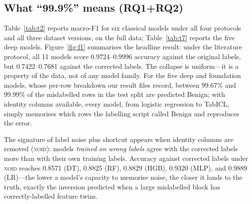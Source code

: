 \documentclass[preprint,12pt]{elsarticle}
\begin{document}
\subsection{What ``99.9\%'' means (RQ1+RQ2)}
\label{sec:99}

Table~\ref{tab:t2} reports macro-F1 for six classical models under all four
protocols and all three dataset versions, on the full data;
Table~\ref{tab:t7} reports the five deep models. Figure~\ref{fig:f1} summarises
the headline result: under the literature protocol, all 11 models score
0.9724--0.9996 accuracy against the original labels, but 0.7422--0.7681 against
the corrected labels. The collapse is uniform---it is a property of the data,
not of any model family. For the five deep and foundation models, whose per-row
breakdown our result files record, between 99.67\% and 99.99\% of the
mislabelled rows in the test split are predicted Benign; with identity columns
available, every model, from logistic regression to TabICL, simply memorises
which rows the labelling script called Benign and reproduces the error.

The signature of label noise plus shortcut appears when identity columns are
removed (\textsc{noid}): models \emph{trained on wrong labels} agree with the
corrected labels more than with their own training labels. Accuracy against
corrected labels under \textsc{noid} reaches 0.8571 (DT), 0.8825 (RF), 0.8829
(HGB), 0.9320 (MLP), and 0.9889 (LR)---the lower a model's capacity to memorise
noise, the closer it lands to the truth, exactly the inversion predicted when a
large mislabelled block has correctly-labelled feature twins.

\begin{table}[t]
\centering
\caption{Macro-F1 (mean $\pm$ 95\% CI) for six classical models under four
protocols (\textsc{lit}: all columns, random 80/20; \textsc{noid}: no identity
columns, random 80/20; \textsc{b12}/\textsc{b21}: cross-base-station, no
identity columns) and three dataset versions (A: original; B: relabelled; C:
mislabelled rows removed + cross-file deduplication). ``A (corrected labels)''
scores version-A models against corrected labels.}
\label{tab:t2}
\footnotesize
\setlength{\tabcolsep}{3.5pt}

\end{table}

\begin{table}[t]
\centering
\caption{Five deep-learning models (3 seeds): macro-F1, accuracy, and the
percentage of mislabelled rows predicted Benign. TabICL is evaluated on a
stratified test subset (Section~\ref{sec:threats}); ``--'' marks cells not run
(\textsc{lit}-B) or undefined (\textsc{b12} test contains no mislabelled
rows).}
\label{tab:t7}
\footnotesize
\setlength{\tabcolsep}{3pt}

\end{table}
\end{document}
